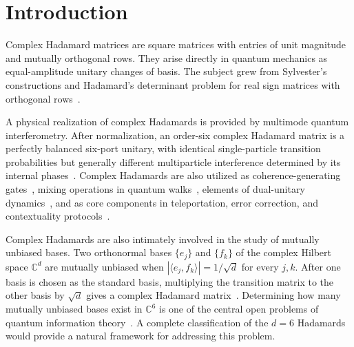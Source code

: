 \documentclass[aps,prx,reprint,nofootinbib,twoside,superscriptaddress,longbibliography,floatfix]{revtex4-2}
\theoremstyle{definition}
\newcommand{\C}{\mathbb C}
\begin{document}
\section{Introduction}
Complex Hadamard matrices are square matrices with entries of unit magnitude and mutually orthogonal rows. They arise directly in quantum mechanics as equal-amplitude unitary changes of basis. The subject grew from Sylvester's constructions and Hadamard's determinant problem for real sign matrices with orthogonal rows~\cite{Sylvester1867,Hadamard1893}. 

A physical realization of complex Hadamards is provided by multimode quantum interferometry. After normalization, an order-six complex Hadamard matrix is a perfectly balanced six-port unitary, with identical single-particle transition probabilities but generally different multiparticle interference determined by its internal phases~\cite{Carolan2015Universal,Laing2012BerryPhase,Tichy2010ZeroTransmission,Crespi2015Sylvester,Crespi2016FFT,Shchesnovich2015Partial}. Complex Hadamards are also utilized as coherence-generating gates~\cite{Yao2016MaximalCoherence}, mixing operations in quantum walks~\cite{Mackay2002QuantumWalks,Lorz2019PhotonicWalks}, elements of dual-unitary dynamics~\cite{Gutkin2020DualUnitary,Claeys2022StateDesigns}, and as core components in teleportation, error correction, and contextuality protocols~\cite{Werner2001Teleportation,Musto2016QuantumLatin,Lisonek2019KochenSpecker}. 

Complex Hadamards are also intimately involved in the study of mutually unbiased bases. Two orthonormal bases $\{e_j\}$ and $\{f_k\}$ of the complex Hilbert space $\C^d$ are mutually unbiased when $|\langle e_j,f_k\rangle|=1/\sqrt d$ for every $j,k$. After one basis is
chosen as the standard basis, multiplying the transition matrix to the other basis by $\sqrt d$ gives a complex Hadamard matrix~\cite{TadejZyczkowski2006,WoottersFields1989,BengtssonEtAl2007}.
Determining how many mutually unbiased bases exist in $\C^6$ is one of the central open problems of quantum information theory~\cite{HorodeckiRudnickiZyczkowski2022,McNultyWeigert2026,BengtssonEtAl2007,MatolcsiEtAl2026MUBTriplets}. A complete classification of the $d =6$ Hadamards would provide a natural framework for addressing this problem.
\end{document}
